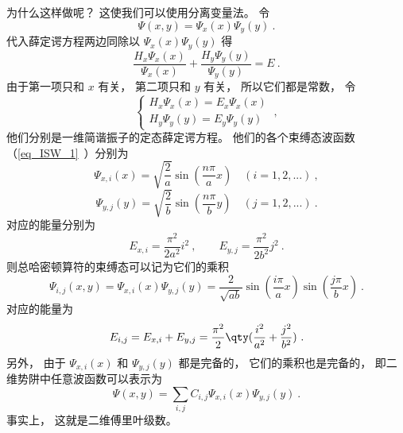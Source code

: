 为什么这样做呢？ 这使我们可以使用分离变量法。 令
\begin{equation}
\Psi(x, y) = \Psi_x(x)\Psi_y(y)~.
\end{equation}
代入薛定谔方程两边同除以 $\Psi_x(x)\Psi_y(y)$ 得
\begin{equation}
\frac{H_x \Psi_x(x)}{\Psi_x(x)} + \frac{H_y \Psi_y(y)}{\Psi_y(y)} = E~.
\end{equation}
由于第一项只和 $x$ 有关， 第二项只和 $y$ 有关， 所以它们都是常数， 令
\begin{equation}
\begin{cases}
H_x \Psi_x(x) = E_x \Psi_x(x)\\
H_y \Psi_y(y) = E_y \Psi_y(y)
\end{cases}~,
\end{equation}
他们分别是一维简谐振子的定态薛定谔方程。 他们的各个束缚态波函数（\autoref{eq_ISW_1}~）分别为
\begin{equation}
\Psi_{x, i}(x) = \sqrt{\frac{2}{a}} \sin(\frac{n\pi}{a} x) \quad (i = 1,2,...)~,
\end{equation}
\begin{equation}
\Psi_{y, j}(y) = \sqrt{\frac{2}{b}} \sin(\frac{n\pi }{b} y) \quad (j = 1,2,...)~.
\end{equation}
对应的能量分别为
\begin{equation}
E_{x, i} = \frac{\pi^2}{2 a^2} i^2~,
\qquad
E_{y, j} = \frac{\pi^2}{2 b^2} j^2~.
\end{equation}
则总哈密顿算符的束缚态可以记为它们的乘积
\begin{equation}
\Psi_{i, j}(x, y) = \Psi_{x, i}(x) \Psi_{y, j}(y) = \frac{2}{\sqrt{ab}} \sin(\frac{i \pi}{a} x) \sin(\frac{j \pi}{b} x)~.
\end{equation}
对应的能量为
\begin{equation}
E_{i, j} = E_{x,i} + E_{y,j} = \frac{\pi^2}{2} \qty(\frac{i^2}{a^2} + \frac{j^2}{b^2})~.
\end{equation}
另外， 由于 $\Psi_{x, i}(x)$ 和 $\Psi_{y, j}(y)$ 都是完备的， 它们的乘积也是完备的， 即二维势阱中任意波函数可以表示为
\begin{equation}
\Psi(x, y) = \sum_{i,j} C_{i, j} \Psi_{x, i}(x) \Psi_{y, j}(y)~.
\end{equation}
事实上， 这就是二维傅里叶级数。 %
